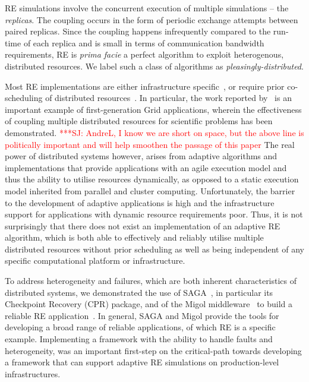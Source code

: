 \documentclass{rspublic}
\newcommand{\jhanote}[1]{ {\textcolor{red} { ***SJ: #1 }}}
\newcommand{\jhanote}[1]{}
\begin{document}
RE simulations involve the concurrent execution of
multiple simulations -- the \emph{replicas}. The coupling occurs in
the form of periodic exchange attempts between paired replicas. Since
the coupling happens infrequently compared to the run-time of each
replica and is small in terms of communication bandwidth requirements,
RE is {\it prima facie} a perfect algorithm to exploit heterogenous,
distributed resources. We label such a class of algorithms as {\it
  pleasingly-distributed}.


Most RE implementations are either infrastructure
specific~\citep{Woods:2005nx}, or require prior co-scheduling of
distributed resources~\citep{repex_mpig}.  
In particular, the work reported by~\citet{repex_mpig} is an important
example of first-generation Grid applications, wherein the
effectiveness of coupling multiple distributed resources for
scientific problems has been demonstrated.  \jhanote{AndreL, I know we
  are short on space, but the above line is politically important and
  will help smoothen the passage of this paper} The real power of
distributed systems however, arises from adaptive algorithms and
implementations that provide applications with an agile execution
model and thus the ability to utilise resources dynamically, as
opposed to a static execution model inherited from parallel and
cluster computing.  Unfortunately, the barrier to the development of
adaptive applications is high and the infrastructure support for
applications with dynamic resource requirements poor.  Thus, it is not
surprisingly that there does not exist an implementation of an
adaptive RE algorithm, which is both able to effectively and reliably
utilise multiple distributed resources without prior scheduling as
well as being independent of any specific computational platform or
infrastructure.
                      
To address heterogeneity and failures, which are both inherent
characteristics of distributed systems, we demonstrated the use of
SAGA~\citep{saga_gfd90}, in particular its Checkpoint Recovery (CPR)
package, and of the Migol middleware~\citep{schnorLuckow08} to build a
reliable RE application~\citep{Luckow:2008la}.
In general, SAGA and Migol provide the tools for developing a broad
range of reliable applications, of which RE is a specific example.
Implementing a framework with the ability to handle faults and
heterogeneity, was an important first-step on the critical-path
towards developing a framework that can support adaptive RE simulations on
production-level infrastructures.
\end{document}
